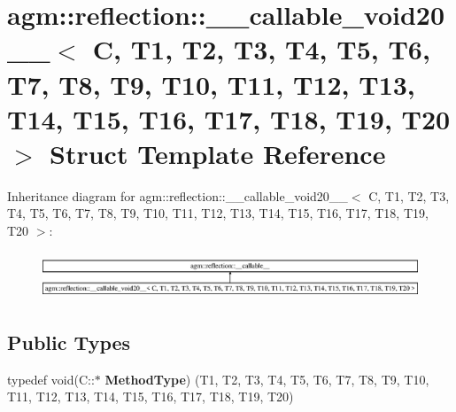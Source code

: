 \hypertarget{structagm_1_1reflection_1_1____callable__void20____}{}\section{agm\+:\+:reflection\+:\+:\+\_\+\+\_\+callable\+\_\+void20\+\_\+\+\_\+$<$ C, T1, T2, T3, T4, T5, T6, T7, T8, T9, T10, T11, T12, T13, T14, T15, T16, T17, T18, T19, T20 $>$ Struct Template Reference}
\label{structagm_1_1reflection_1_1____callable__void20____}
Inheritance diagram for agm\+:\+:reflection\+:\+:\+\_\+\+\_\+callable\+\_\+void20\+\_\+\+\_\+$<$ C, T1, T2, T3, T4, T5, T6, T7, T8, T9, T10, T11, T12, T13, T14, T15, T16, T17, T18, T19, T20 $>$\+:\begin{figure}[H]
\begin{center}
\leavevmode
\includegraphics[height=1.408805cm]{structagm_1_1reflection_1_1____callable__void20____}
\end{center}
\end{figure}
\subsection*{Public Types}
\begin{DoxyCompactItemize}
\item 
typedef void(C\+::$\ast$ {\bfseries Method\+Type}) (T1, T2, T3, T4, T5, T6, T7, T8, T9, T10, T11, T12, T13, T14, T15, T16, T17, T18, T19, T20)\hypertarget{structagm_1_1reflection_1_1____callable__void20_____a0a58cfa019fe9fe852748d62752e646d}{}\label{structagm_1_1reflection_1_1____callable__void20_____a0a58cfa019fe9fe852748d62752e646d}

\end{DoxyCompactItemize}
